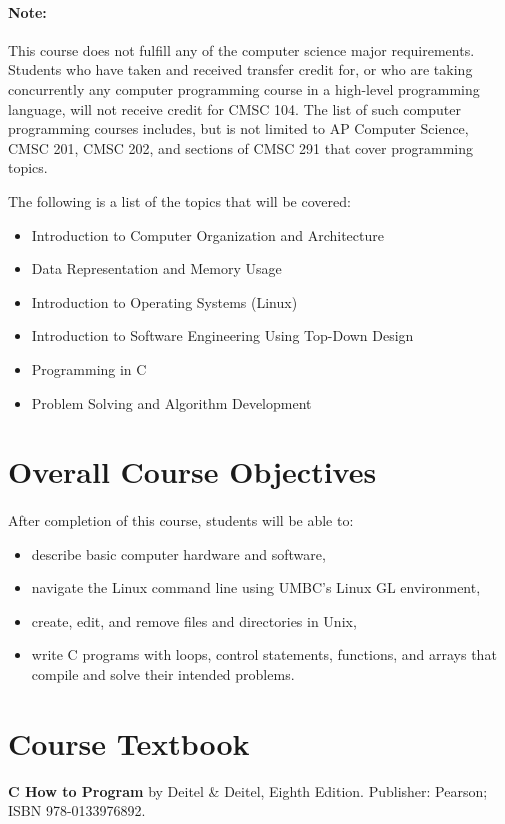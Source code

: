 \documentclass[letter,11pt]{article}
\begin{document}
\paragraph{Note:}This course does not fulfill any of the computer science major requirements. Students who have taken and received transfer credit for, or who are taking concurrently any computer programming course in a high-level programming language, will not receive credit for CMSC 104. The list of such computer programming courses includes, but is not limited to AP Computer Science, CMSC 201, CMSC 202, and sections of CMSC 291 that cover programming topics.

The following is a list of the topics that will be covered:
\begin{itemize}
\item Introduction to Computer Organization and Architecture
\item Data Representation and Memory Usage
\item Introduction to Operating Systems (Linux)
\item Introduction to Software Engineering Using Top-Down Design
\item Programming in C
\item Problem Solving and Algorithm Development
\end{itemize}

\section*{Overall Course Objectives}
\paragraph{}After completion of this course, students will be able to:
\begin{multicols}{2}
\begin{itemize}
    \item describe basic computer hardware and software,
    \item navigate the Linux command line using UMBC's Linux GL environment,
    \item create, edit, and remove files and directories in Unix,
    \item write C programs with loops, control statements, functions, and arrays that compile and solve their intended problems.
\end{itemize}
\end{multicols}

\section*{Course Textbook}
\textbf{C How to Program} by Deitel \& Deitel, Eighth Edition. Publisher: Pearson; ISBN 978-0133976892.
\end{document}
